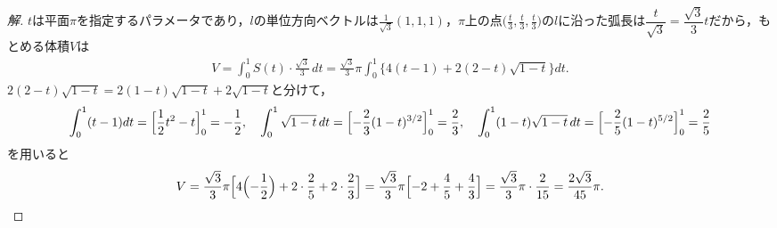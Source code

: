 \documentclass[../main.tex]{subfiles}
\begin{document}
\begin{proof}[解]
  $t$は平面$\pi$を指定するパラメータであり，$l$の単位方向ベクトルは$\frac1{\sqrt3}(1,1,1)$，$\pi$上の点$\bigl(\frac t3,\frac t3,\frac t3\bigr)$の$l$に沿った弧長は$\dfrac t{\sqrt3}=\dfrac{\sqrt3}3t$だから，もとめる体積$V$は
  \begin{align*}
    V=\int_0^1S(t)\cdot\frac{\sqrt3}3\,dt=\frac{\sqrt3}3\pi\int_0^1\bigl\{4(t-1)+2(2-t)\sqrt{1-t}\bigr\}dt.
  \end{align*}
  $2(2-t)\sqrt{1-t}=2(1-t)\sqrt{1-t}+2\sqrt{1-t}$と分けて，
  \begin{align*}
    \int_0^1(t-1)dt=\Bigl[\frac12t^2-t\Bigr]_0^1=-\frac12,\quad
    \int_0^1\sqrt{1-t}\,dt=\Bigl[-\frac23(1-t)^{3/2}\Bigr]_0^1=\frac23,\quad
    \int_0^1(1-t)\sqrt{1-t}\,dt=\Bigl[-\frac25(1-t)^{5/2}\Bigr]_0^1=\frac25
  \end{align*}
  を用いると
  \begin{align*}
    V=\frac{\sqrt3}3\pi\Bigl[4\Bigl(-\frac12\Bigr)+2\cdot\frac25+2\cdot\frac23\Bigr]=\frac{\sqrt3}3\pi\Bigl[-2+\frac45+\frac43\Bigr]=\frac{\sqrt3}3\pi\cdot\frac2{15}=\frac{2\sqrt3}{45}\pi.
  \end{align*}
\end{proof}
\end{document}
